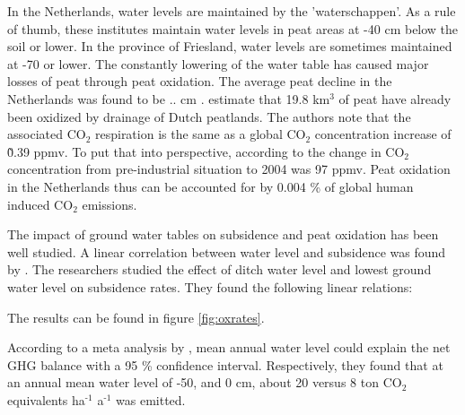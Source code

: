 \documentclass[12pt,a4paper,titlepage]{article}
\newcommand{\sur}[1]{\ensuremath{^{\textrm{#1}}}}
\newcommand{\sous}[1]{\ensuremath{_{\textrm{#1}}}}
\begin{document}
In the Netherlands, water levels are maintained by the 'waterschappen'. As a rule of thumb, these institutes maintain water levels in peat areas at -40 cm below the soil or lower. In the province of Friesland, water levels are sometimes maintained at -70 or lower. The constantly lowering of the water table has caused major losses of peat through peat oxidation. The average peat decline in the Netherlands was found to be .. cm \citep{erkens2016double}. \citet{erkens2016double} estimate that 19.8 km\sur{3} of peat have already been oxidized by drainage of Dutch peatlands. The authors note that the associated CO\sous{2} respiration is the same as a global CO\sous{2} concentration increase of \~0.39 ppmv. To put that into perspective, according to \citet{quadrelli2007energy} the change in CO\sous{2} concentration from pre-industrial situation to 2004 was 97 ppmv. Peat oxidation in the Netherlands thus can be accounted for by 0.004 \% of global human induced CO\sous{2} emissions.
 
The impact of ground water tables on subsidence and peat oxidation has been well studied. A linear correlation between water level and subsidence was found by \citet{van2010emission}. The researchers studied the effect of ditch water level and lowest ground water level on subsidence rates. They found the following linear relations:


The results can be found in figure \ref{fig:oxrates}. 




According to a meta analysis by \citet{wichtmann2016paludiculture}, mean annual water level could explain the net GHG balance with a 95 \% confidence interval. Respectively, they found that at an annual mean water level of -50, and 0 cm, about 20 versus 8 ton CO\sous{2} equivalents ha\sur{-1} a\sur{-1} was emitted. %
\end{document}
